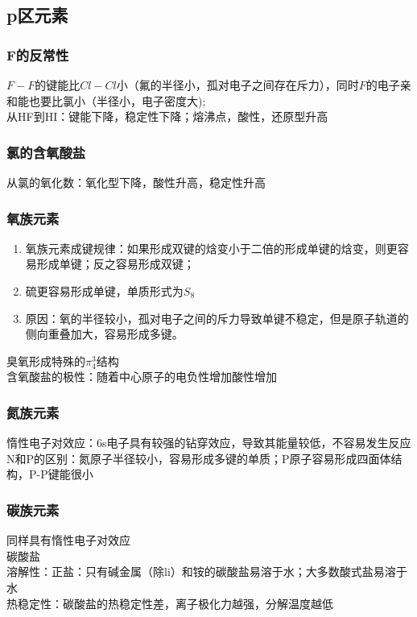 \documentclass[utf8,a4paper,12pt]{ctexart}
\begin{document}
\subsection{p区元素}
\subsubsection{F的反常性}
$F-F$的键能比$Cl-Cl$小（氟的半径小，孤对电子之间存在斥力），同时$F$的电子亲和能也要比氯小（半径小，电子密度大);\\
从HF到HI：键能下降，稳定性下降；熔沸点，酸性，还原型升高\\
\subsubsection{氯的含氧酸盐}
从氯的氧化数：氧化型下降，酸性升高，稳定性升高\\
\subsubsection{氧族元素}
\begin{enumerate}[(1)]
\item 氧族元素成键规律：如果形成双键的焓变小于二倍的形成单键的焓变，则更容易形成单键；反之容易形成双键；
\item 硫更容易形成单键，单质形式为$S_8$
\item 原因：氧的半径较小，孤对电子之间的斥力导致单键不稳定，但是原子轨道的侧向重叠加大，容易形成多键。
\end{enumerate}
臭氧形成特殊的$\pi^3_4$结构\\
含氧酸盐的极性：随着中心原子的电负性增加酸性增加\\
\subsubsection{氮族元素}
惰性电子对效应：6s电子具有较强的钻穿效应，导致其能量较低，不容易发生反应\\
N和P的区别：氮原子半径较小，容易形成多键的单质；P原子容易形成四面体结构，P-P键能很小\\
\subsubsection{碳族元素}
同样具有惰性电子对效应\\
碳酸盐\\
溶解性：正盐：只有碱金属（除li）和铵的碳酸盐易溶于水；大多数酸式盐易溶于水\\
热稳定性：碳酸盐的热稳定性差，离子极化力越强，分解温度越低\\
\end{document}
